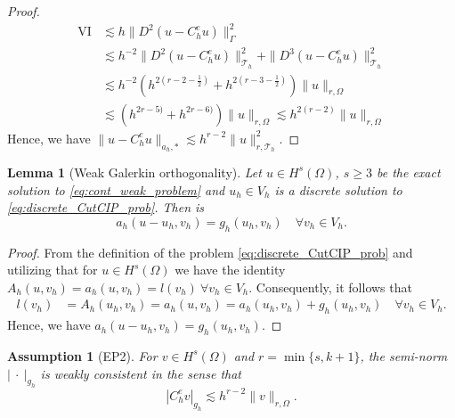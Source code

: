 \documentclass[11pt]{article}
\newtheorem*{assumption*}{Assumption} %
\newtheorem{lemma}[theorem]{Lemma}
\theoremstyle{remark}
\newcommand{\abs}[1]{\left\lvert #1 \right\rvert}
\renewcommand{\ge}{\geqslant}
\numberwithin{equation}{section}
\begin{document}
\begin{proof}
        \begin{equation}
            \begin{split}
            \mathrm{VI} &    \lesssim h \|  D^2  ( u - C_{h}^{e}u ) \|_{\Gamma }^{2  }  \\
            & \lesssim  h^{-2} \| D^2 ( u - C_{h}^{e}u )  \|_{ \mathcal{T}_{h}   }^{2  } + \| D^3( u - C_{h}^{e}u ) \|_{ \mathcal{T}_{h}   }^{ 2 } \\
            &  \lesssim h^{-2}( h^{2(r - 2 - \frac{1}{2})} + h^{2(r - 3 - \frac{1}{2})})\| u \|_{r,\Omega   }^{  } \\
            &  \lesssim ( h^{2r - 5)} + h^{2r - 6)})\| u \|_{r,\Omega   }^{  } \lesssim h^{2(r-2)} \| u \|_{r,\Omega   }^{  }
            \end{split}
        \end{equation}
    Hence, we have $ \| u - C_{h}^{e} u \|_{a_{h},*  }^{  } \lesssim   h^{r-2}  \| u \|_{ r, \mathcal{T}_{h}   }^{2  } $.
\end{proof}

\begin{lemma}[Weak Galerkin orthogonality]
    \label{lemma:weak_galerkin_ort}
Let $u \in H^{s}( \Omega )  $, $ s\ge 3 $  be the exact solution to   \eqref{eq:cont_weak_problem} and $u_{h} \in V_{h}$ is a discrete solution to \eqref{eq:discrete_CutCIP_prob}. Then is \[
    a_{h}( u - u_{h}, v_{h}) = g_{h} ( u_{h}, v_{h}) \quad \forall v_{h} \in V_{h}.
    \]
\end{lemma}

\begin{proof}
   From the definition of the problem \eqref{eq:discrete_CutCIP_prob} and utilizing that for $u \in H^{s}( \Omega ) $ we have the identity  $A_{h}( u,v_{h}) = a_{h}( u,v_{h}) = l(v_{h} )  \ \forall v_{h} \in V_{h} $. Consequently, it follows that \[
       \begin{split}
   l(v_{h} ) & =  A_{h}( u_{h},v_{h}) =  a_{h}( u,v_{h})  = a_{h}( u_{h},v_{h})+g_{h}( u_{h},v_{h})  \quad \forall  v_{h} \in  V_{h}.
       \end{split}
   \]
    Hence, we have $a_{h}( u -  u_{h}, v_{h}) = g_{h}( u_{h},v_{h})  $.
\end{proof}

\begin{assumption*}[EP2]
    For $v \in H^{s}( \Omega ) $ and $r = \min \{s,k+1 \} $, the semi-norm $\abs{ \ \cdot \  }_{g_{h}} $ is weakly consistent in the sense that
    \begin{equation}
        \label{as:bi_EP2}
        \abs{ C _{h}^{e} v } _{g_{h}} \lesssim  h^{r-2} \| v \|_{ r,\Omega  }^{  }.
    \end{equation}
\end{assumption*}
\end{document}
